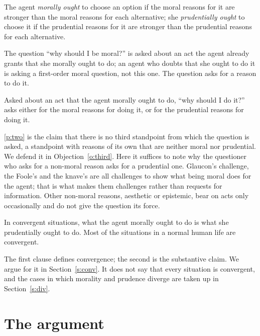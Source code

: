 \documentclass{situationist-preprint}
\begin{document}
\begin{definition}\label{d:ought}
The agent \emph{morally ought} to choose an option if the moral reasons for it are stronger than the moral reasons for each alternative; she \emph{prudentially ought} to choose it if the prudential reasons for it are stronger than the prudential reasons for each alternative.
\end{definition}

The question \enquote{why should I be moral?} is asked about an act the agent already grants that she morally ought to do; an agent who doubts that she ought to do it is asking a first-order moral question, not this one. The question asks for a reason to do it.

\begin{principle}\label{p:two}
Asked about an act that the agent morally ought to do, \enquote{why should I do it?} asks either for the moral reasons for doing it, or for the prudential reasons for doing it.
\end{principle}

\ref{p:two} is the claim that there is no third standpoint from which the question is asked, a standpoint with reasons of its own that are neither moral nor prudential. We defend it in Objection~\ref{o:third}. Here it suffices to note why the questioner who asks for a non-moral reason asks for a prudential one. Glaucon's challenge, the Foole's and the knave's are all challenges to show what being moral does for the agent; that is what makes them challenges rather than requests for information. Other non-moral reasons, aesthetic or epistemic, bear on acts only occasionally and do not give the question its force.

\begin{assumption}[Convergence]\label{a:conv}
In convergent situations, what the agent morally ought to do is what she prudentially ought to do. Most of the situations in a normal human life are convergent.
\end{assumption}

The first clause defines convergence; the second is the substantive claim. We argue for it in Section~\ref{s:conv}. It does not say that every situation is convergent, and the cases in which morality and prudence diverge are taken up in Section~\ref{s:div}.

\section{The argument}
\end{document}
